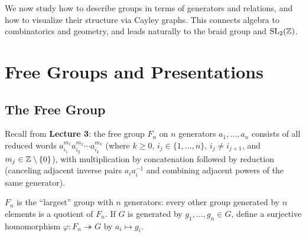\documentclass{report}
\begin{document}

We now study how to describe groups in terms of generators and relations, and how to visualize their structure via Cayley graphs. This connects algebra to combinatorics and geometry, and leads naturally to the braid group and \(\mathrm{SL}_2(\ZZ)\).


\section{Free Groups and Presentations}

\subsection{The Free Group}

Recall from \textbf{Lecture 3}: the free group \(F_n\) on \(n\) generators \(a_1, \ldots, a_n\) consists of all reduced words \(a_{i_1}^{m_1} a_{i_2}^{m_2} \cdots a_{i_k}^{m_k}\) (where \(k \geq 0\), \(i_j \in \{1, \ldots, n\}\), \(i_j \neq i_{j+1}\), and \(m_j \in \ZZ \setminus \{0\}\)), with multiplication by concatenation followed by reduction (canceling adjacent inverse pairs \(a_i a_i^{-1}\) and combining adjacent powers of the same generator).

\(F_n\) is the ``largest'' group with \(n\) generators: every other group generated by \(n\) elements is a quotient of \(F_n\). If \(G\) is generated by \(g_1, \ldots, g_n \in G\), define a surjective homomorphism \(\varphi : F_n \twoheadrightarrow G\) by \(a_i \mapsto g_i\).


\end{document}
